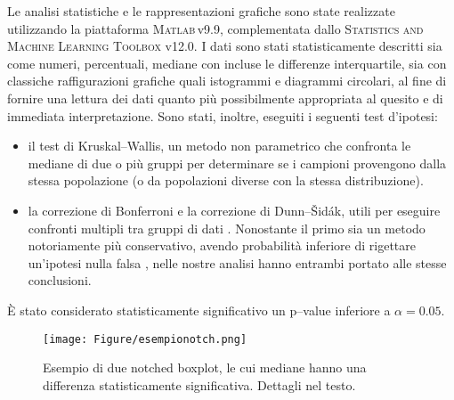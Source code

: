 Le analisi statistiche e le rappresentazioni grafiche sono state realizzate utilizzando la piattaforma \textsc{Matlab}\textsuperscript{\tiny\sffamily\textregistered}\!\,v9.9, complementata dallo \textsc{Statistics and Machine Learning Toolbox} v12.0. I dati sono stati statisticamente descritti sia come numeri, percentuali, mediane con incluse le differenze interquartile, sia con classiche raffigurazioni grafiche quali istogrammi e diagrammi circolari, al fine di fornire una lettura dei dati quanto più possibilmente appropriata al quesito e di immediata interpretazione. Sono stati, inoltre, eseguiti i seguenti test d'ipotesi:

\begin{itemize}
    \item il test di Kruskal--Wallis, un metodo non parametrico che confronta le mediane di due o più gruppi per determinare se i campioni provengono dalla stessa popolazione (o da popolazioni diverse con la stessa distribuzione).
    \item la correzione di Bonferroni e la correzione di Dunn--Šidák, utili per eseguire confronti multipli tra gruppi di dati \cite{review_multiple_comparisons}. Nonostante il primo sia un metodo notoriamente più conservativo, avendo probabilità inferiore di rigettare un'ipotesi nulla falsa \cite{Farewell_Bonferroni,Rejecting_Bonferroni}, nelle nostre analisi hanno entrambi portato alle stesse conclusioni. 
    
    
    
\end{itemize}

\`E stato considerato statisticamente significativo un p--value inferiore a $\alpha = 0.05$.

\bigskip

\begin{figure}[h]
    \centering
    \texttt{[image: Figure/esempionotch.png]}
    \caption{Esempio di due notched boxplot, le cui mediane hanno una differenza statisticamente significativa. Dettagli nel testo.}
    \label{fig:notch}
\end{figure}

